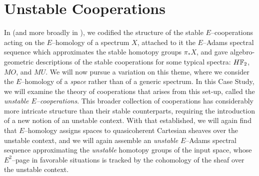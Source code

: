 
\chapter{Unstable Cooperations}\label{UnstableCooperationsChapter}


In  (and more broadly in ), we codified the structure of the stable \(E\)--cooperations acting on the \(E\)--homology of a spectrum \(X\), attached to it the \(E\)--Adams spectral sequence which approximates the stable homotopy groups \(\pi_* X\), and gave algebro-geometric descriptions of the stable cooperations for some typical spectra: \(\HFtwo\), \(MO\), and \(MU\).  We will now pursue a variation on this theme, where we consider the \(E\)--homology of a \emph{space} rather than of a generic spectrum.  In this Case Study, we will examine the theory of cooperations that arises from this set-up, called the \textit{unstable \(E\)--cooperations}.  This broader collection of cooperations has considerably more intricate structure than their stable counterparts, requiring the introduction of a new notion of an unstable context.  With that established, we will again find that \(E\)--homology assigns spaces to quasicoherent Cartesian sheaves over the unstable context, and we will again assemble an \emph{unstable} \(E\)--Adams spectral sequence approximating the \emph{unstable} homotopy groups of the input space, whose \(E^2\)--page in favorable situations is tracked by the cohomology of the sheaf over the unstable context.

